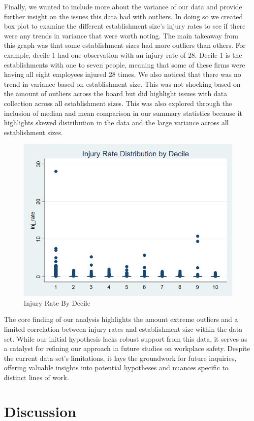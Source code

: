 \documentclass[12pt]{article}
\begin{document}
Finally, we wanted to include more about the variance of our data and provide further insight on the issues this data had with outliers. In doing so we created box plot to examine the different establishment size's injury rates to see if there were any trends in variance that were worth noting. The main takeaway from  this graph was that some establishment sizes had more outliers than others. For example, decile 1 had one observation with an injury rate of 28. Decile 1 is the establishments with one to seven people, meaning that some of these firms were having all eight employees injured 28 times. We also noticed that there was no trend in variance based on establishment size. This was not shocking based on the amount of outliers across the board but did highlight issues with data collection across all establishment sizes. This was also explored through the inclusion of median and mean comparison in our summary statistics because it highlights skewed distribution in the data and the large variance across all establishment sizes. 

\begin{figure}
    \centering
    \includegraphics[width=0.5\linewidth]{InjRateBox (2).png}
    \caption{Injury Rate By Decile}
    \label{fig:enter-label}
\end{figure}
The core finding of our analysis highlights the amount extreme outliers and a limited correlation between injury rates and establishment size within the data set. While our initial hypothesis lacks robust support from this data, it serves as a catalyst for refining our approach in future studies on workplace safety. Despite the current data set's limitations, it lays the groundwork for future inquiries, offering valuable insights into potential hypotheses and nuances specific to distinct lines of work.  



\section{Discussion}
\label{sec:discussion}
\end{document}
